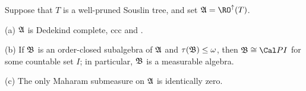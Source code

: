 Suppose that $T$ is a well-pruned
Souslin tree, and set $\frak A=\RO^{\uparrow}(T)$.

(a) $\frak A$ is Dedekind complete, ccc and \wsid.

(b) If $\frak B$ is an order-closed subalgebra of $\frak A$ and
$\tau(\frak B)\le\omega$, then $\frak B\cong\Cal PI$ for some countable set
$I$;  in particular, $\frak B$ is a measurable algebra.

(c) The only Maharam submeasure on
$\frak A$ is identically zero.

